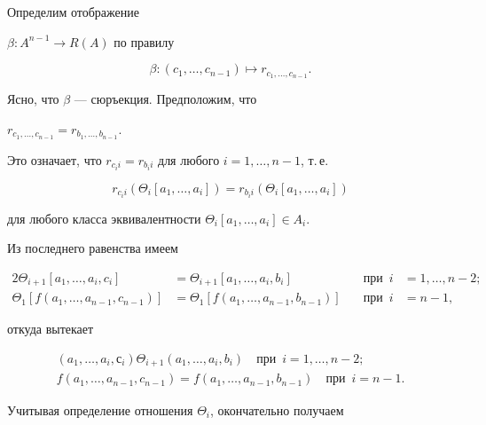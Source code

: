 \begin{pf}


Определим отображение


$\beta:A^{n-1}\to R(A)$ по правилу


$$


\beta: (c_1, \dotsc, c_{n-1})\mapsto r_{c_1,\dotsc,c_{n-1}}.


$$


Ясно, что $\beta$ --- сюръекция. Предположим, что


$r_{c_1,\dotsc,c_{n-1}}=r_{b_1,\dotsc,b_{n-1}}$.


Это означает, что $r_{c_ii}=r_{b_ii}$ для любого $i=1,\dotsc, n-1$, т.\,е.


$$


r_{c_ii}(\Theta_i[a_1,\dotsc,a_i])=


r_{b_ii}(\Theta_i[a_1,\dotsc,a_i])


$$


для любого класса эквивалентности $\Theta_i[a_1,\dotsc, a_i]\in A_i$.


Из последнего равенства имеем


\begin{alignat*}{2}


\Theta_{i+1}[a_1,\dotsc,a_i,c_i]&=\Theta_{i+1}[a_1,\dotsc,a_i,b_i]&\quad


\text{при}\ \; i &= 1,\dotsc, n-2; \\


%


\Theta_1[f(a_1,\dotsc, a_{n-1},c_{n-1})] &= \Theta_1[f(a_1,\dotsc, a_{n-1},


b_{n-1})]&\quad \text{при}\ \; i &= n-1,


\end{alignat*}


откуда вытекает


\begin{gather*}


(a_1,\dotsc, a_i,с_i)\Theta_{i+1}(a_1,\dotsc, a_i,b_i)\quad \text{при}


\ \; i = 1,\dotsc, n-2; \\


%


f(a_1,\dotsc, a_{n-1},c_{n-1}) = f(a_1,\dotsc, a_{n-1},b_{n-1})\quad


\text{при}\ \; i =n-1.


\end{gather*}


Учитывая определение отношения $\Theta_i$, окончательно получаем



\end{pf}

